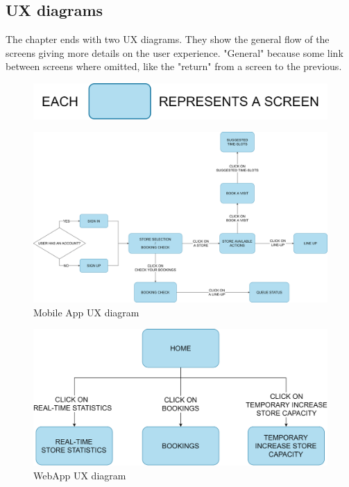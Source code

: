 \documentclass[]{article}
\begin{document}
		\newpage
		\subsection{UX diagrams}
		The chapter ends with two UX diagrams. They show the general flow of the screens giving more details on the user experience. "General" because some link between screens where omitted, like the "return" from a screen to the previous.
		
		\begin{figure}[H]
			\includegraphics[scale=0.7]{UX diagrams/legend}
			\label{fig:MobileAppUXdiagram}
		\end{figure}
		\begin{figure}[H]
			\centering
			\includegraphics[scale=0.38]{UX diagrams/mobileApp}
			\caption{Mobile App UX diagram}
			\label{fig:MobileAppUXdiagram}
		\end{figure}
		\bigskip \bigskip \bigskip \bigskip
		\begin{figure}[H]
			\centering
			\includegraphics[scale=0.38]{UX diagrams/webAppHome}
			\caption{WebApp UX diagram}
			\label{fig:MobileAppUXdiagram}
		\end{figure}
			
\end{document}
